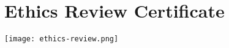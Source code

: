 \chapter{Ethics Review Certificate}
\centering
    \texttt{[image: ethics-review.png]}
    \label{fig:ethics-review}